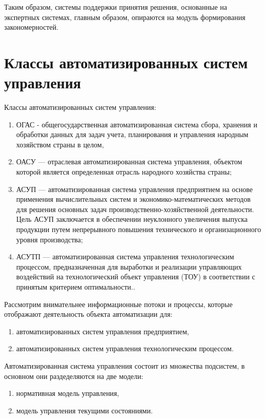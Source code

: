Таким образом, системы поддержки принятия решения, основанные на экспертных системах, главным образом, опираются на модуль формирования закономерностей.

\section{Классы автоматизированных систем управления}\label{sec:ch2/sec1}
Классы автоматизированных систем управления:
\begin{enumerate}
	\item ОГАС - общегосударственная автоматизированная система сбора, хранения и обработки данных для задач учета, планирования и управления народным хозяйством страны в целом,
	\item ОАСУ — отраслевая автоматизированная система управления, объектом которой является определенная отрасль народного хозяйства страны;
	\item АСУП — автоматизированная система управления предприятием на основе применения вычислительных систем и экономико-математических методов для решения основных задач производственно-хозяйственной деятельности. Цель АСУП заключается в обеспечении неуклонного увеличения выпуска продукции путем непрерывного повышения технического и организационного уровня производства;
	\item АСУТП — автоматизированная система управления технологическим процессом, предназначенная для выработки и реализации управляющих воздействий на технологический объект управления (ТОУ) в соответствии с принятым критерием оптимальности..
\end{enumerate}
Рассмотрим внимательнее информационные потоки и процессы, которые отображают деятельность объекта автоматизации для:
\begin{enumerate}
	\item автоматизированных систем управления предприятием,
	\item автоматизированных систем управления технологическим процессом.
\end{enumerate}

Автоматизированная система управления состоит из множества подсистем, в основном они раздеделяются на две модели:
\begin{enumerate}
	\item нормативная модель управления,
	\item модель управления текущими состояниями.
\end{enumerate}

